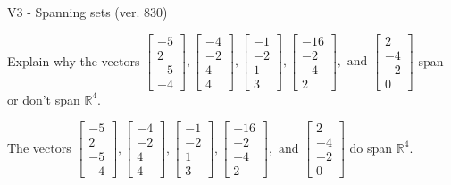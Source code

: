 \begin{exercise}
  \begin{exerciseTitle}V3 - Spanning sets (ver. 830)\end{exerciseTitle}
  \begin{exerciseStatement}
    Explain why the vectors \(\left[\begin{array}{r}
-5 \\
2 \\
-5 \\
-4
\end{array}\right] , \left[\begin{array}{r}
-4 \\
-2 \\
4 \\
4
\end{array}\right] , \left[\begin{array}{r}
-1 \\
-2 \\
1 \\
3
\end{array}\right] , \left[\begin{array}{r}
-16 \\
-2 \\
-4 \\
2
\end{array}\right] , \text{ and } \left[\begin{array}{r}
2 \\
-4 \\
-2 \\
0
\end{array}\right]\) span or don't span \(\mathbb{R}^4\). 
	


  \end{exerciseStatement}
  \begin{exerciseAnswer}
   The vectors \(\left[\begin{array}{r}
-5 \\
2 \\
-5 \\
-4
\end{array}\right] , \left[\begin{array}{r}
-4 \\
-2 \\
4 \\
4
\end{array}\right] , \left[\begin{array}{r}
-1 \\
-2 \\
1 \\
3
\end{array}\right] , \left[\begin{array}{r}
-16 \\
-2 \\
-4 \\
2
\end{array}\right] , \text{ and } \left[\begin{array}{r}
2 \\
-4 \\
-2 \\
0
\end{array}\right]\) 
  	 do  
	span \(\mathbb{R}^4\).
  



\end{exerciseAnswer}
\end{exercise}
